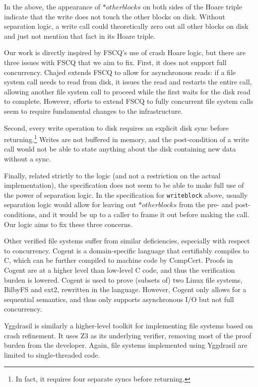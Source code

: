 In the above, the appearance of $\ast otherblocks$ on both sides of the Hoare
triple indicate that the write does not touch the other blocks on disk. Without
separation logic, a write call could theoretically zero out all other blocks on
disk and just not mention that fact in its Hoare triple.

Our work is directly inspired by FSCQ's use of crash Hoare logic, but there are
three issues with FSCQ that we aim to fix. First, it does not support full
concurrency. Chajed\cite{chajed2017verifying} extends FSCQ to allow for
asynchronous reads: if a file system call needs to read from disk, it issues the
read and restarts the entire call, allowing another file system call to proceed
while the first waits for the disk read to complete. However, efforts to extend
FSCQ to fully concurrent file system calls seem to require fundamental changes
to the infrastructure.

Second, every write operation to disk requires an explicit disk sync before
returning.\footnote{In fact, it requires four separate syncs before returning.}
Writes are not buffered in memory, and the post-condition of a write call would
not be able to state anything about the disk containing new data without a sync.

Finally, related strictly to the logic (and not a restriction on the actual
implementation), the specification does not seem to be able to make full use of
the power of separation logic. In the specification for \texttt{writeblock}
above, usually separation logic would allow for leaving out $\ast otherblocks$
from the pre- and post-conditions, and it would be up to a caller to frame it
out before making the call. Our logic aims to fix these three concerns.

Other verified file systems suffer from similar deficiencies, especially with
respect to concurrency. Cogent\cite{amani2016cogent} is a domain-specific
language that certifiably compiles to C, which can be further compiled to
machine code by CompCert. Proofs in Cogent are at a higher level than low-level
C code, and thus the verification burden is lowered. Cogent is used to prove
(subsets of) two Linux file systems, BilbyFS and ext2, rewritten in the
language. However, Cogent only allows for a sequential semantics, and thus only
supports asynchronous I/O but not full concurrency.

Yggdrasil\cite{sigurbjarnarson2016push} is similarly a higher-level toolkit for
implementing file systems based on crash refinement. It uses Z3 as its underlying
verifier, removing most of the proof burden from the developer. Again, file
systems implemented using Yggdrasil are limited to single-threaded code.

